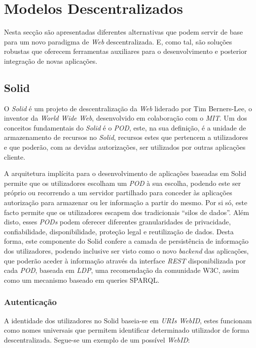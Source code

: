 \section{Modelos Descentralizados \label{section_modelos_descentralizados}}
Nesta secção são apresentadas diferentes alternativas que podem servir de base para um novo paradigma de \emph{Web} descentralizada. E, como tal, são soluções robustas que oferecem ferramentas auxiliares para o desenvolvimento e posterior integração de novas aplicações.

\subsection{Solid \label{estado_arte_solid}}
O \emph{Solid} é um projeto de descentralização da \emph{Web} liderado por Tim Berners-Lee, o inventor da \emph{World Wide Web}, desenvolvido em colaboração com o \emph{\acrfull{MIT}}.
Um dos conceitos fundamentais do \emph{Solid} é o \emph{\acrfull{POD}}, este, na sua definição, é a unidade de armazenamento de recursos no \emph{Solid}, recursos estes que pertencem a utilizadores e que poderão, com as devidas autorizações, ser utilizados por outras aplicações cliente.

A arquitetura implícita para o desenvolvimento de aplicações baseadas em Solid permite que os utilizadores escolham um \emph{\acrshort{POD}} à sua escolha, podendo este ser próprio ou recorrendo a um servidor partilhado para conceder às aplicações autorização para armazenar ou ler informação a partir do mesmo. Por si só, este facto permite que os utilizadores escapem dos tradicionais “silos de dados”. Além disto, esses \emph{PODs} podem oferecer diferentes granularidades de privacidade, confiabilidade, disponibilidade, proteção legal e reutilização de dados\cite{solid_official}. Desta forma, este componente do Solid confere a camada de persistência de informação dos utilizadores, podendo inclusive ser visto como o novo \emph{backend} das aplicações, que poderão aceder à informação através da interface \emph{\acrfull{REST}}\cite{rest_foundations} disponibilizada por cada \emph{\acrshort{POD}}, baseada em \emph{\acrfull{LDP}}, uma recomendação da comunidade W3C, assim como um mecanismo baseado em queries SPARQL\cite{solid_spec}.


\subsubsection{Autenticação \label{section_estado_arte_solid_authentication}}
A identidade dos utilizadores no Solid baseia-se em \emph{URIs WebID}, estes funcionam como nomes universais que permitem identificar determinado utilizador de forma descentralizada. Segue-se um exemplo de um possível \emph{WebID}:

